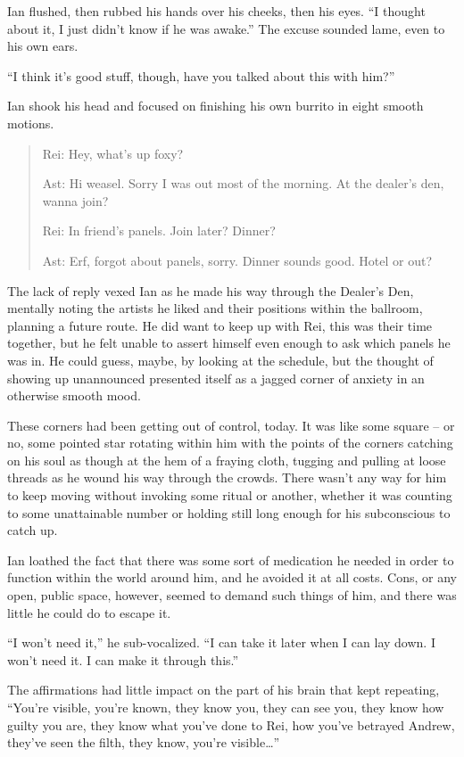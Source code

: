 Ian flushed, then rubbed his hands over his cheeks, then his eyes. ``I thought about it, I just didn't know if he was awake.'' The excuse sounded lame, even to his own ears.

``I think it's good stuff, though, have you talked about this with him?''

Ian shook his head and focused on finishing his own burrito in eight smooth motions.

\secdiv

\begin{quotation}
  Rei: Hey, what's up foxy?

  Ast: Hi weasel. Sorry I was out most of the morning. At the dealer's den, wanna join?

  Rei: In friend's panels. Join later? Dinner?

  Ast: Erf, forgot about panels, sorry. Dinner sounds good. Hotel or out?
\end{quotation}

The lack of reply vexed Ian as he made his way through the Dealer's Den, mentally noting the artists he liked and their positions within the ballroom, planning a future route. He did want to keep up with Rei, this was their time together, but he felt unable to assert himself even enough to ask which panels he was in. He could guess, maybe, by looking at the schedule, but the thought of showing up unannounced presented itself as a jagged corner of anxiety in an otherwise smooth mood.

These corners had been getting out of control, today. It was like some square -- or no, some pointed star rotating within him with the points of the corners catching on his soul as though at the hem of a fraying cloth, tugging and pulling at loose threads as he wound his way through the crowds. There wasn't any way for him to keep moving without invoking some ritual or another, whether it was counting to some unattainable number or holding still long enough for his subconscious to catch up.

Ian loathed the fact that there was some sort of medication he needed in order to function within the world around him, and he avoided it at all costs. Cons, or any open, public space, however, seemed to demand such things of him, and there was little he could do to escape it.

``I won't need it,'' he sub-vocalized. ``I can take it later when I can lay down. I won't need it. I can make it through this.''

The affirmations had little impact on the part of his brain that kept repeating, ``You're visible, you're known, they know you, they can see you, they know how guilty you are, they know what you've done to Rei, how you've betrayed Andrew, they've seen the filth, they know, you're visible\ldots{}''

